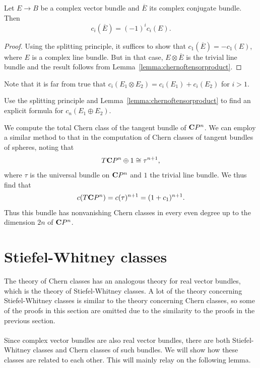 \documentclass[a4paper,openany]{scrbook}
\begin{document}
\begin{lemma}
Let $E \to B$ be a complex vector bundle and $\overline E$ its complex conjugate bundle. Then
\[
c_i(\overline E) = (-1)^i c_i(E).
\]
\end{lemma}
\begin{proof}
Using the splitting principle, it suffices to show that $c_1(\overline E) = -c_1(E)$, where $E$ is a complex line bundle. But in that case, $E \otimes \overline E$ is the trivial line bundle and the result follows from Lemma~\ref{lemma:chernoftensorproduct}.
\end{proof}

Note that it is far from true that $c_i(E_1 \otimes E_2) = c_i(E_1) + c_i(E_2)$ for $i>1$.

\begin{exer}
Use the splitting principle and Lemma~\ref{lemma:chernoftensorproduct} to find an explicit formula for $c_n(E_1 \oplus E_2)$.
\end{exer}

\begin{example}\label{exa:chernclassofcpn}
We compute the total Chern class of the tangent bundle of $\mathbf C P^n$. We can employ a similar method to that in the computation of Chern classes of tangent bundles of spheres, noting that
\[
T\mathbf C P^n \oplus 1 \cong \tau^{n+1},
\]
where $\tau$ is the universal bundle on $\mathbf C P^n$ and $1$ the trivial line bundle. We thus find that
\[
c(T\mathbf C P^n) = c(\tau)^{n+1} = (1+c_1)^{n+1}.
\]
Thus this bundle has nonvanishing Chern classes in every even degree up to the dimension $2n$ of $\mathbf C P^n$.
\end{example}

\section{Stiefel-Whitney classes}
The theory of Chern classes has an analogous theory for real vector bundles, which is the theory of Stiefel-Whitney classes. A lot of the theory concerning Stiefel-Whitney classes is similar to the theory concerning Chern classes, so some of the proofs in this section are omitted due to the similarity to the proofs in the previous section.
\\\\
Since complex vector bundles are also real vector bundles, there are both Stiefel-Whitney classes and Chern classes of such bundles. We will show how these classes are related to each other. This will mainly relay on the following lemma.
\end{document}
